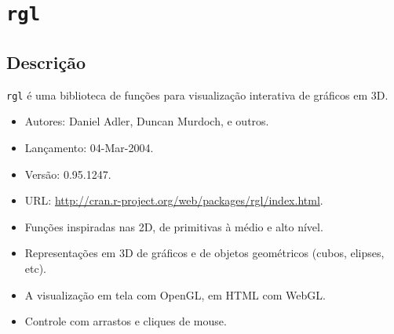 \section{\texttt{rgl}}

\subsection{Descrição}


\begin{frame}

  \texttt{rgl} é uma biblioteca de funções para visualização interativa
  de gráficos em 3D.  \vspace{2em}
  
  \begin{itemize}
  \item Autores: Daniel Adler, Duncan Murdoch, e outros.
  \item Lançamento: 04-Mar-2004.
  \item Versão: 0.95.1247.
  \item URL:
    \url{http://cran.r-project.org/web/packages/rgl/index.html}.
  \end{itemize}

\end{frame}


\begin{frame}
 
  \begin{itemize}
  \item Funções inspiradas nas 2D, de primitivas à médio e alto nível.
    \newline 
  \item Representações em 3D de gráficos e de objetos geométricos
    (cubos, elipses, etc).
  \item A visualização em tela com OpenGL, em HTML com WebGL.
  \item Controle com arrastos e cliques de mouse.
  \end{itemize}
  \vspace{2em}

\end{frame}


